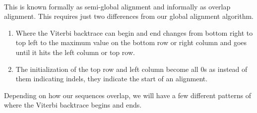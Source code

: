 \documentclass[11pt]{article}
\begin{document}
 \\

\noindent
This is known formally as semi-global alignment and informally as overlap alignment. This requires just two differences from our global alignment algorithm.
\begin{enumerate}
\item Where the Viterbi backtrace can begin and end changes from bottom right to top left to the maximum value on the bottom row or right column and goes until it hits the left column or top row.
\item The initialization of the top row and left column become all 0s as instead of them indicating indels, they indicate the start of an alignment.
\end{enumerate}
Depending on how our sequences overlap, we will have a few different patterns of where the Viterbi backtrace begins and ends. \\
\end{document}
